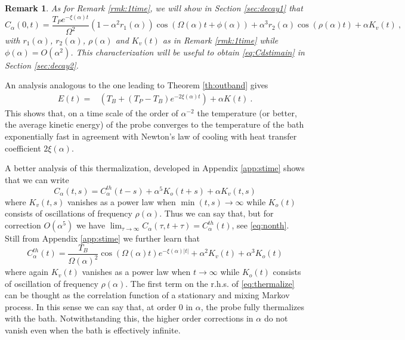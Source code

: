 \documentclass[11pt]{article}
\numberwithin{equation}{section}
\newtheorem{rmk}[theorem]{Remark}
\numberwithin{theorem}{section}
\begin{document}
\begin{rmk}\label{rmk:1timeres}
\emph{As for Remark \ref{rmk:1time}, we will show in Section \ref{sec:decay1} that
\begin{equation}\label{eq:C1r}
C_\alpha(0,t)=\frac{T_P e^{-\xi(\alpha)t}}{\Omega^2}(1-\alpha^2r_1(\alpha))
\cos(\Omega(\alpha)t+\phi(\alpha)) + \alpha^3
r_2(\alpha)\cos(\rho(\alpha)t)+\alpha K_v(t)\ ,
\end{equation}
with $r_1(\alpha)$, $r_2(\alpha)$, $\rho(\alpha)$ and $K_v(t)$ as in Remark \ref{rmk:1time} while
$\phi(\alpha)=O(\alpha^2)$. This characterization will be useful to obtain \eqref{eq:Cdstimain} in Section \ref{sec:decay2}.}
\end{rmk}

An analysis analogous to the one leading to Theorem \ref{th:outband} gives
\[
\begin{aligned}
E(t)=&\left(T_B+(T_P-T_B)e^{-2\xi(\alpha)t}\right)
+\alpha K(t)\ .
\end{aligned}
\]
This shows that, on a time scale of the order of $\alpha^{-2}$ the temperature (or better, the average kinetic energy) 
of the probe converges to the temperature of the bath exponentially fast in agreement with Newton's law of cooling with 
heat transfer coefficient $2\xi(\alpha)$.

A better analysis of this thermalization, developed in Appendix \ref{app:stime} shows that we can write
\begin{equation}\label{eq:poly}
C_\alpha(t,s)=C_\alpha^{th}(t-s)+\alpha^5 K_o(t+s)+\alpha K_v(t,s)
\end{equation}
where $K_v(t,s)$ vanishes as a power law when $\min(t,s)\to\infty$ while $K_o(t)$ consists of oscillations of frequency 
$\rho(\alpha)$. Thus we can say that, but for correction $O(\alpha^5)$ we have $\lim_{\tau\to\infty} 
C_\alpha(\tau,t+\tau)=C_\alpha^{th}(t)$, see \eqref{eq:nonth}. Still from Appendix \ref{app:stime} we further learn that
\begin{equation}\label{eq:thermalize}
C_\alpha^{th}(t)=\frac{T_B}{\Omega(\alpha)^2}\cos(\Omega(\alpha)t)
e^{-\xi(\alpha)|t|}+\alpha^2K_v(t)+\alpha^3 K_o(t)
\end{equation}
where again $K_v(t)$ vanishes as a power law when $t\to\infty$ while $K_o(t)$ consists of
oscillation of frequency $\rho(\alpha)$. The first term on the r.h.s. of \eqref{eq:thermalize}
can be thought as the correlation function of a stationary and mixing Markov process. In this
sense we can say that, at order 0 in $\alpha$, the probe fully thermalizes with the bath.
Notwithstanding this, the higher order corrections in $\alpha$ do not vanish even when the bath is
effectively infinite.
\end{document}
